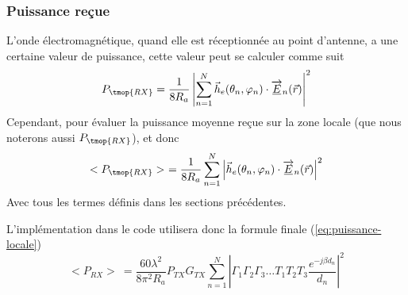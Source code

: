 \subsubsection*{Puissance reçue}
L'onde {\'e}lectromagn{\'e}tique, quand elle est r{\'e}ceptionn{\'e}e au point
d'antenne, a une certaine valeur de puissance, cette valeur peut se calculer
comme suit
\[ P_{\tmop{RX}} = \frac{1}{8 R_a} \left| \sum_{n = 1}^N \vec{h}_e (\theta_n,
   \varphi_n) \cdot \overrightarrow{\underline{E}}_n (\vec{r}) \right|^2 \]
Cependant, pour {\'e}valuer la puissance moyenne re{\c c}ue sur la zone locale
(que nous noterons aussi $P_{\tmop{RX}}$), et donc
\[ < P_{\tmop{RX}} >\ = \frac{1}{8 R_a} \sum_{n = 1}^N \left| \vec{h}_e (\theta_n,
   \varphi_n) \cdot \overrightarrow{\underline{E}}_n (\vec{r}) \right|^2 \]
Avec tous les termes d{\'e}finis dans les sections pr{\'e}c{\'e}dentes.

L'implémentation dans le code utilisera donc la formule finale (\ref{eq:puissance-locale})
\begin{equation}
\label{eq:puissance-locale}
    <P_{RX}>\ = \frac{60 \lambda^2}{8 \pi^2 R_a}P_{TX}G_{TX}\sum_{n=1}^N \left| \Gamma_1 \Gamma_2 \Gamma_3 \dotsc T_1 T_2 T_3 \frac{e^{-j \beta d_n}}{d_n} \right|^2
\end{equation}

\ 